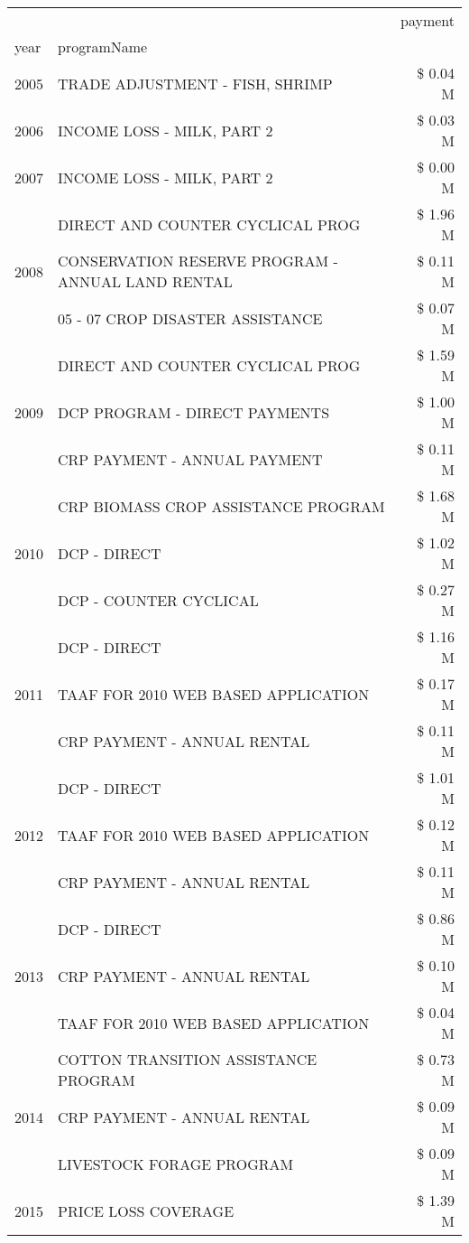 \begin{tabular}{llr}
\toprule
 &  & payment \\
year & programName &  \\
\midrule
2005 & TRADE ADJUSTMENT - FISH, SHRIMP & \$ 0.04 M \\
\cline{1-3}
2006 & INCOME LOSS - MILK, PART 2 & \$ 0.03 M \\
\cline{1-3}
2007 & INCOME LOSS - MILK, PART 2 & \$ 0.00 M \\
\cline{1-3}
\multirow[t]{3}{*}{2008} & DIRECT AND COUNTER CYCLICAL PROG & \$ 1.96 M \\
 & CONSERVATION RESERVE PROGRAM - ANNUAL LAND RENTAL & \$ 0.11 M \\
 & 05 - 07 CROP DISASTER ASSISTANCE & \$ 0.07 M \\
\cline{1-3}
\multirow[t]{3}{*}{2009} & DIRECT AND COUNTER CYCLICAL PROG & \$ 1.59 M \\
 & DCP PROGRAM - DIRECT PAYMENTS & \$ 1.00 M \\
 & CRP PAYMENT - ANNUAL PAYMENT & \$ 0.11 M \\
\cline{1-3}
\multirow[t]{3}{*}{2010} & CRP BIOMASS CROP ASSISTANCE PROGRAM & \$ 1.68 M \\
 & DCP - DIRECT & \$ 1.02 M \\
 & DCP - COUNTER CYCLICAL & \$ 0.27 M \\
\cline{1-3}
\multirow[t]{3}{*}{2011} & DCP - DIRECT & \$ 1.16 M \\
 & TAAF FOR 2010 WEB BASED APPLICATION & \$ 0.17 M \\
 & CRP PAYMENT - ANNUAL RENTAL & \$ 0.11 M \\
\cline{1-3}
\multirow[t]{3}{*}{2012} & DCP - DIRECT & \$ 1.01 M \\
 & TAAF FOR 2010 WEB BASED APPLICATION & \$ 0.12 M \\
 & CRP PAYMENT - ANNUAL RENTAL & \$ 0.11 M \\
\cline{1-3}
\multirow[t]{3}{*}{2013} & DCP - DIRECT & \$ 0.86 M \\
 & CRP PAYMENT - ANNUAL RENTAL & \$ 0.10 M \\
 & TAAF FOR 2010 WEB BASED APPLICATION & \$ 0.04 M \\
\cline{1-3}
\multirow[t]{3}{*}{2014} & COTTON TRANSITION ASSISTANCE PROGRAM & \$ 0.73 M \\
 & CRP PAYMENT - ANNUAL RENTAL & \$ 0.09 M \\
 & LIVESTOCK FORAGE PROGRAM & \$ 0.09 M \\
\cline{1-3}
\multirow[t]{3}{*}{2015} & PRICE LOSS COVERAGE & \$ 1.39 M \\

\end{tabular}
